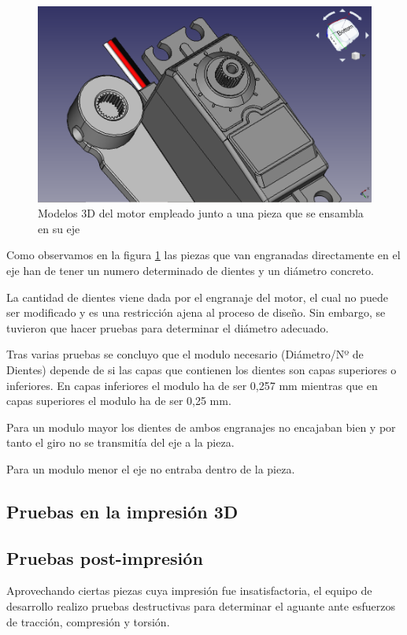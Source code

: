 \begin{figure}[H]
    \centering
    \includegraphics[width=.7\linewidth]{pictures/ComparativaEngranajes.png}
    \caption{Modelos 3D del motor empleado junto a una pieza que se ensambla en su eje}
    \label{fig:comparativa_engranajes}
\end{figure}

Como observamos en la figura \ref{fig:comparativa_engranajes} las piezas que van engranadas directamente en el eje han de tener un numero determinado de dientes y un diámetro concreto.

La cantidad de dientes viene dada por el engranaje del motor, el cual no puede ser modificado y es una restricción ajena al proceso de diseño. Sin embargo, se tuvieron que hacer pruebas para determinar el diámetro adecuado.

Tras varias pruebas se concluyo que el modulo necesario (Diámetro/Nº de Dientes) depende de si las capas que contienen los dientes son capas superiores o inferiores.
En capas inferiores el modulo ha de ser 0,257 mm mientras que en capas superiores el modulo ha de ser 0,25 mm.

Para un modulo mayor los dientes de ambos engranajes no encajaban bien y por tanto el giro no se transmitía del eje a la pieza.

Para un modulo menor el eje no entraba dentro de la pieza.

\subsection{Pruebas en la impresión 3D}


\subsection{Pruebas post-impresión}
\label{pruebas_post_impresión}

Aprovechando ciertas piezas cuya impresión fue insatisfactoria, el equipo de desarrollo realizo pruebas destructivas para determinar el aguante ante esfuerzos de tracción, compresión y torsión.

